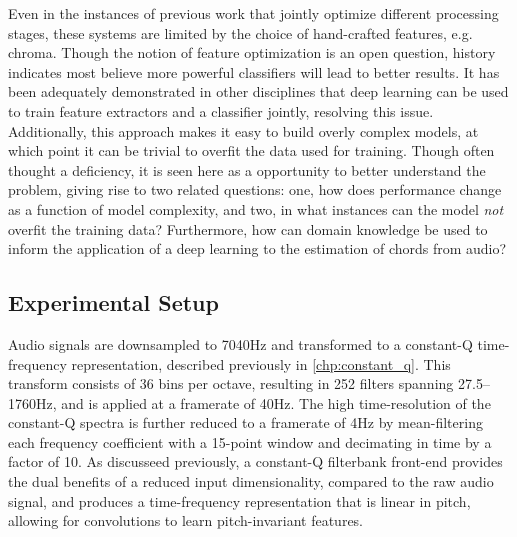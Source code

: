 Even in the instances of previous work that jointly optimize different processing stages, these systems are limited by the choice of hand-crafted features, e.g. chroma.
Though the notion of feature optimization is an open question, history indicates most believe more powerful classifiers will lead to better results.
It has been adequately demonstrated in other disciplines that deep learning can be used to train feature extractors and a classifier jointly, resolving this issue.
Additionally, this approach makes it easy to build overly complex models, at which point it can be trivial to overfit the data used for training.
Though often thought a deficiency, it is seen here as a opportunity to better understand the problem, giving rise to two related questions: one, how does performance change as a function of model complexity, and two, in what instances can the model \emph{not} overfit the training data?
Furthermore, how can domain knowledge be used to inform the application of a deep learning to the estimation of chords from audio?


\subsection{Experimental Setup}
\label{subsec:experimental_setup}

Audio signals are downsampled to 7040Hz and transformed to a constant-Q time-frequency representation, described previously in \ref{chp:constant_q}.
This transform consists of 36 bins per octave, resulting in 252 filters spanning 27.5--1760Hz, and is applied at a framerate of 40Hz.
The high time-resolution of the constant-Q spectra is further reduced to a framerate of 4Hz by mean-filtering each frequency coefficient with a 15-point window and decimating in time by a factor of 10.
As discusseed previously, a constant-Q filterbank front-end provides the dual benefits of a reduced input dimensionality, compared to the raw audio signal, and produces a time-frequency representation that is linear in pitch, allowing for convolutions to learn pitch-invariant features.

